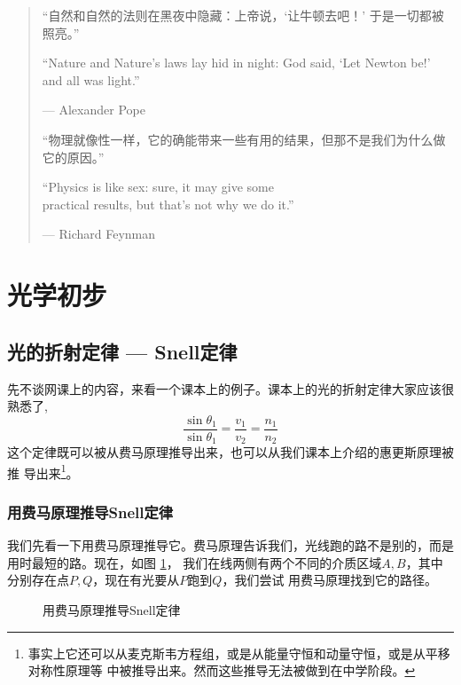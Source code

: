 \begin{quotation}
``自然和自然的法则在黑夜中隐藏：上帝说，`让牛顿去吧！' 于是一切都被照亮。''

{\ttfamily
\begin{sloppypar}
``Nature and Nature's laws lay hid in night:
God said, `Let Newton be!' and all was light.''
\end{sloppypar}

--- Alexander Pope}

``物理就像性一样，它的确能带来一些有用的结果，但那不是我们为什么做它的原因。''

{\ttfamily
``Physics is like sex: sure, it may give some \\
practical results, but that's not why 
we do it.''

--- Richard Feynman}

\end{quotation}

\section{光学初步}
\subsection{光的折射定律 --- Snell定律}
先不谈网课上的内容，来看一个课本上的例子。课本上的光的折射定律大家应该很熟悉了,
\[
\frac{\sin{\theta_1}}{\sin{\theta_1}} = \frac{v_1}{v_2} = \frac{n_1}{n_2}
\]
这个定律既可以被从费马原理\cite{FMsPrinciple}推导出来，也可以从我们课本上介绍的惠更斯原理被推
导出来\footnote{事实上它还可以从麦克斯韦方程组，或是从能量守恒和动量守恒，或是从平移对称性原理等
中被推导出来。然而这些推导无法被做到在中学阶段。}。

\subsubsection{用费马原理推导Snell定律}
我们先看一下用费马原理推导它。费马原理告诉我们，光线跑的路不是别的，而是用时最短的路。现在，如图
\ref{fig:DeriveSenllsLawFromFermats}，
我们在线两侧有两个不同的介质区域$A, B$，其中分别存在点$P, Q$，现在有光要从$P$跑到$Q$，我们尝试
用费马原理找到它的路径。

\begin{figure}[!hbpt]
\begin{center}
\end{center}
\caption{用费马原理推导Snell定律}
\label{fig:DeriveSenllsLawFromFermats}
\end{figure}

